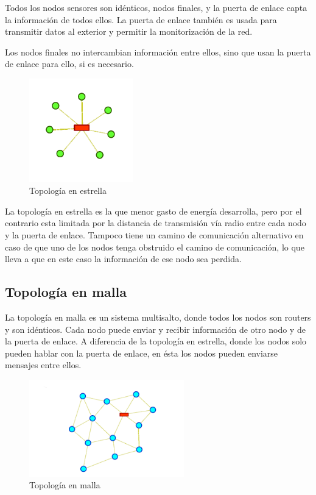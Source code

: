 Todos los nodos sensores son id\'enticos, nodos finales, y la puerta de enlace capta la informaci\'on de todos ellos. La
puerta de enlace tambi\'en es usada para transmitir datos al exterior y permitir la monitorizaci\'on de la red. 

Los nodos finales no intercambian informaci\'on entre ellos, sino que usan la puerta de enlace para ello, si es necesario.

\begin{figure}[htb]
    \centering
    \includegraphics[width=0.4\textwidth]{imagenes/estrella.png}
    \caption{Topología en estrella}
    \label{fig:top_estrella}
\end{figure}

La topolog\'ia en estrella es la que menor gasto de energ\'ia desarrolla, pero por el contrario esta limitada por la
distancia de transmisi\'on v\'ia radio entre cada nodo y la puerta de enlace. Tampoco tiene un camino de comunicaci\'on
alternativo en caso de que uno de los nodos tenga obstruido el camino de comunicaci\'on, lo que lleva a que en este caso
la informaci\'on de ese nodo sea perdida.


\subsection{Topolog\'ia en malla}
La topolog\'ia en malla es un sistema multisalto, donde todos los nodos son routers y son id\'enticos. Cada nodo puede
enviar y recibir informaci\'on de otro nodo y de la puerta de enlace. A diferencia de la topolog\'ia en estrella, donde los
nodos solo pueden hablar con la puerta de enlace, en \'esta los nodos pueden enviarse mensajes entre ellos. 

\begin{figure}[htb]
    \centering
    \includegraphics[width=0.6\textwidth]{imagenes/malla.png}
    \caption{Topología en malla}
    \label{fig:top_malla}
\end{figure}

